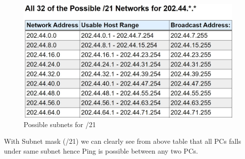 \documentclass[a4paper,11pt]{article}
\begin{document}
\begin{enumerate}

          \begin{figure}[H]
              \centering
              \includegraphics[scale=0.63,cframe=blue 0.5pt 3pt]{./FIG/C21.jpg}
              \caption{Possible subnets for /21 }
          \end{figure}

          With Subnet mask (/21) we can clearly see from above table that all PCs falls under same subnet hence Ping is possible between any two PCs.



\end{enumerate}




\pagebreak
%
%
%
%

%
%
%
%
%


\end{document}
